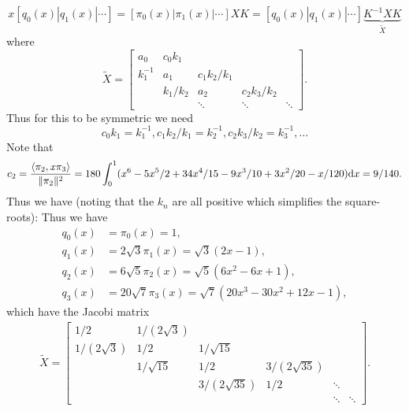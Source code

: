 \begin{example}
\[
x [q_0(x) | q_1(x) | \ensuremath{\cdots}] = [\ensuremath{\pi}_0(x)| \ensuremath{\pi}_1(x)| \ensuremath{\cdots}] X K = [q_0(x) | q_1(x) | \ensuremath{\cdots}] \underbrace{K^{-1} X K}_{\tilde X}
\]
where
\[
\tilde X = \begin{bmatrix} a_0 & c_0 k_1 \\
                         k_1^{-1} & a_1 & c_1 k_2/k_1 \\
                         & k_1/k_2 & a_2 & c_2 k_3/k_2 \\
                         &&\ensuremath{\ddots} & \ensuremath{\ddots} & \ensuremath{\ddots} \end{bmatrix}.
\]
Thus for this to be symmetric we need
\[
c_0 k_1 = k_1^{-1}, c_1 k_2/k_1 = k_2^{-1}, c_2 k_3/k_2 = k_3^{-1}, \ensuremath{\ldots}
\]
Note that
\[
c_2 = {\ensuremath{\langle}\ensuremath{\pi}_2,x \ensuremath{\pi}_3\ensuremath{\rangle}  \over \|\ensuremath{\pi}_2\|^2} = 180 \ensuremath{\int}_0^1 (x^6 -5x^5/2 + 34x^4/15 - 9x^3/10 + 3x^2/20 - x/120){\rm d} x = 9/140.
\]
Thus we have (noting that the $k_n$ are all positive which simplifies the square-roots):
Thus we have
\begin{align*}
q_0(x) &= \ensuremath{\pi}_0(x) = 1, \\
q_1(x) &= 2\sqrt{3} \ensuremath{\pi}_1(x)= \sqrt{3} (2  x - 1), \\
q_2(x) &= 6\sqrt{5} \ensuremath{\pi}_2(x) = \sqrt{5} (6x^2 - 6x + 1), \\
q_3(x) &= 20 \sqrt{7} \ensuremath{\pi}_3(x) = \sqrt{7} (20x^3-30x^2 + 12x - 1),
\end{align*}
which have the Jacobi matrix
\begin{align*}
\tilde X =
     \begin{bmatrix} 1/2 & 1/(2\sqrt{3}) \\
                    1/(2\sqrt{3}) & 1/2 &  1/\sqrt{15} \\
                    & 1/\sqrt{15} & 1/2 & 3/(2 \sqrt{35}) \\
                    && 3/(2 \sqrt{35}) &  1/2 & \ensuremath{\ddots} \\
                    &&& & \ensuremath{\ddots} & \ensuremath{\ddots} \end{bmatrix}.
\end{align*}
\end{example}

